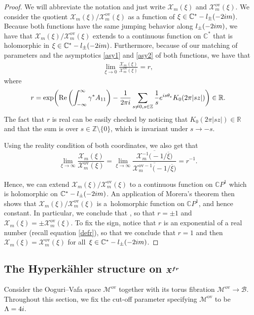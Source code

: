 \documentclass[11pt]{article}
\numberwithin{equation}{section}
\numberwithin{equation}{section}
\newcommand{\CP}{\mathbb{C}P^1}
\newcommand{\MC}{\mathcal{X}_m}
\newcommand{\MCOV}{\mathcal{X}_m^{\text{ov}}}
\newcommand{\MCOVI}{\mathcal{X}_m^{\text{ov}-1}}
\begin{document}
\begin{proof} We will abbreviate the notation and just write $\MC(\xi)$ and $\MC^{\text{ov}}(\xi)$.
We consider the quotient $\MC(\xi)/\MC^{\text{ov}}(\xi)$ as a function of $\xi \in \mathbb{C}^*-l_{\pm}(-2{\rm i}m)$. Because both functions have the same jumping behavior along $l_{\pm}(-2{\rm i}m)$, we have that $\MC(\xi)/\MC^{\text{ov}}(\xi)$ extends to a continuous function on $\mathbb{C}^*$ that is holomorphic in $\xi \in \mathbb{C}^*-l_{\pm}(-2{\rm i}m)$. Furthermore, because of our matching of parameters and the asymptotics \eqref{asy1} and \eqref{asy2} of both functions, we have that
\begin{gather}
 \lim_{\xi \to 0}\frac{\MC(\xi)}{\MCOV(\xi)}= r,\label{defr}
\end{gather}
where
\begin{gather*}
 r=\exp \biggl( \operatorname{Re}\left(\int_{-\infty}^{\infty}\gamma^*A_{11}\right) -\frac{1}{2\pi {\rm i}}\sum_{s\neq 0, s \in \mathbb{Z}}\frac{1}{s}{\rm e}^{{\rm i}s\theta_e}K_0(2\pi |sz|) \biggr)\in \mathbb{R}.
\end{gather*}
The fact that $r$ is real can be easily checked by noticing that $K_0(2\pi|sz|)\in \mathbb{R}$ and that the sum is over $s\in \mathbb{Z}\setminus\{0\}$, which is invariant under $s\to -s$.

Using the reality condition of both coordinates, we also get that
\begin{equation*}
 \lim_{\xi \to \infty}\frac{\MC(\xi)}{\MCOV(\xi)}= \lim_{\xi \to \infty}\frac{\overline{\MC^{-1}\bigl(-1/\overline{\xi}\bigr)}}{\overline{\MCOVI\bigl(-1/\overline{\xi}\bigr)}}=r^{-1}.
\end{equation*}

Hence, we can extend $\MC(\xi)/\MC^{\text{ov}}(\xi)$ to a continuous function on $\CP$ which is holomorphic on $\mathbb{C}^*-l_{\pm}(-2{\rm i}m)$. An application of Morera's theorem then shows that $\MC(\xi)/\MC^{\text{ov}}(\xi)$ is a~holomorphic function on $\CP$, and hence constant. In particular, we conclude that
\smash{$
 \frac{\MC(\xi)}{\MCOV(\xi)}=r=r^{-1}$},
so that $r=\pm 1$ and $\MC(\xi)=\pm \MCOV(\xi)$. To fix the sign, notice that $r$ is an exponential of a real number (recall equation \eqref{defr}), so that we conclude that $r=1$ and then $\MC(\xi)=\MCOV(\xi)$ for all~${\xi \in \mathbb{C}^* - l_{\pm}(-2{\rm i}m)}$.
\end{proof}


\subsection[The Hyperk\"ahler structure on X\^{}\{fr\}]{The Hyperk\"ahler structure on $\boldsymbol{\mathfrak{X}^{{\rm fr}}}$}
Consider the Ooguri--Vafa space $\mathcal{M}^{\text{ov}}$ together with its torus fibration $\mathcal{M}^{\text{ov}}\to \mathcal{B}$. Throughout this section, we fix the cut-off parameter specifying $\mathcal{M}^{\text{ov}}$ to be $\Lambda=4{\rm i}$.
\end{document}
